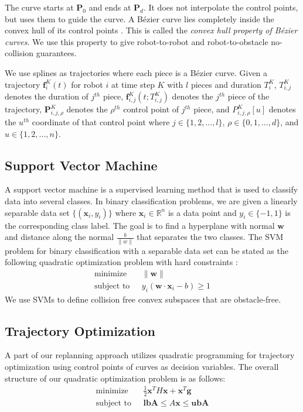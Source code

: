 \documentclass{svproc}
\newcommand{\vP}{\mathbf{P}}
\newcommand{\vg}{\mathbf{g}}
\newcommand{\vf}{\mathbf{f}}
\newcommand{\vw}{\mathbf{w}}
\newcommand{\vx}{\mathbf{x}}
\newcommand{\vlbA}{\mathbf{lbA}}
\newcommand{\vubA}{\mathbf{ubA}}
\newcommand{\vlb}{\mathbf{lb}}
\newcommand{\vub}{\mathbf{ub}}
\newcommand{\R}{\mathbb{R}} %
\begin{document}
The curve starts at $\vP_0$ and ends at $\vP_d$. It does not interpolate the control points, but uses them to guide the curve. A B\'ezier curve lies completely inside the convex hull of its control points \cite{Bernstein}. This is called the \emph{convex hull property of B\'ezier curves}. We use this property to give robot-to-robot and robot-to-obstacle no-collision guarantees.

We use splines as trajectories where each piece is a B\'ezier curve. Given a trajectory $\vf^{K}_i(t)$ for robot $i$ at time step $K$ with $l$ pieces and duration $T^{K}_i$, $T^{K}_{i,j}$ denotes the duration of $j^{th}$ piece, $\vf^{K}_{i,j}(t; T^{K}_{i,j})$ denotes the $j^{th}$ piece of the trajectory, $\vP^{K}_{i,j,\rho}$ denotes the $\rho^{th}$ control point of $j^{th}$ piece, and $P^{K}_{i,j,\rho}[u]$ denotes the $u^{th}$ coordinate of that control point where $j \in \{1,2,...,l\}$, $\rho \in \{0,1,...,d\}$, and $u \in \{1,2,...,n\}$.


\subsection{Support Vector Machine}\label{svmSection}
A support vector machine is a supervised learning method that is used to classify data into several classes.
In binary classification problems, we are given a linearly separable data set $\{(\vx_i, y_i)\}$ where $\vx_i \in \R^n$ is a data point and $y_i \in \{-1, 1\}$ is the corresponding class label.
The goal is to find a hyperplane with normal $\vw$ and distance along the normal $\frac{b}{\|w\|}$ that separates the two classes.
The SVM problem for binary classification with a separable data set can be stated as the following quadratic optimization problem with hard constraints \cite{SVM}:
\begin{align*}
    \text{minimize}\ \ \  &\|\vw\|\\
    \text{subject to}\ \ \  & y_i(\vw \cdot \vx_i - b) \geq 1
\end{align*}
We use SVMs to define collision free convex subspaces that are obstacle-free.
\subsection{Trajectory Optimization} \label{trajectoryOptimization}
A part of our replanning approach utilizes quadratic programming for trajectory optimization using control points of curves as decision variables. The overall structure of our quadratic optimization problem is as follows:
\begin{align*}
    \text{minimize}\ \ \ &\frac{1}{2}\vx^TH\vx + \vx^T\vg\\
    \text{subject to}\ \ \ & \vlbA \leq A\vx \leq \vubA
\end{align*}
\end{document}
